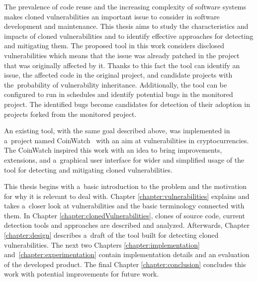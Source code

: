   The prevalence of code reuse and the increasing complexity of software systems makes cloned vulnerabilities
  an important issue to consider in software development and maintenance. This thesis aims to study the
  characteristics and impacts of cloned vulnerabilities and to identify effective approaches for detecting
  and mitigating them. The proposed tool in this work considers disclosed vulnerabilities which means
  that the issue was already patched in the project that was originally affected by it. Thanks to this fact
  the tool can identify an issue, the affected code in the original project, and candidate projects with
  the~probability of vulnerability inheritance. Additionally, the tool can be configured to run in schedules
  and identify potential bugs in the monitored project. The identified bugs become candidates for
  detection of their adoption in projects forked from the monitored project.

  An existing tool, with the same goal described above, was implemented in a~project named CoinWatch~\cite{CoinWatch}
  with an aim at vulnerabilities in cryptocurrencies. The CoinWatch inspired this work
  with an idea to bring improvements, extensions, and a~graphical user interface for wider and simplified
  usage of the tool for detecting and mitigating cloned vulnerabilities.

  This thesis begins with a~basic introduction to the problem and the motivation for why it is relevant
  to deal with. Chapter \ref{chapter:vulnerabilities} explains and takes a~closer look at vulnerabilities
  and the basic terminology connected with them. In Chapter \ref{chapter:clonedVulnerabilities}, clones of source
  code, current detection tools and approaches are described and analyzed. Afterwards, Chapter \ref{chapter:design}
  describes a~draft of the tool built for detecting cloned vulnerabilities. The next two Chapters
  \ref{chapter:implementation} and~\ref{chapter:experimentation} contain implementation details
  and an evaluation of the developed product. The final Chapter \ref{chapter:conclusion} concludes this work
  with potential improvements for future work.
